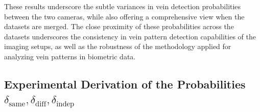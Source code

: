 These results underscore the subtle variances in vein detection probabilities between the two cameras, while also offering a comprehensive view when the datasets are merged. The close proximity of these probabilities across the datasets underscores the consistency in vein pattern detection capabilities of the imaging setups, as well as the robustness of the methodology applied for analyzing vein patterns in biometric data.

\subsection{Experimental Derivation of the Probabilities \(\delta_{\text{same}}, \delta_{\text{diff}}, \delta_{\text{indep}}\)}

